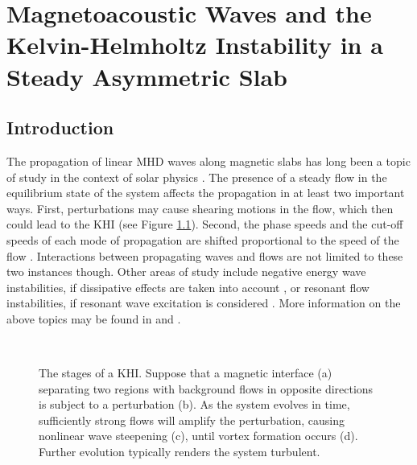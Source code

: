 \chapter{Magnetoacoustic Waves and the Kelvin-Helmholtz Instability in a Steady Asymmetric Slab}

\section{Introduction}

The propagation of linear MHD waves along magnetic slabs has long been a topic of study in the context of solar physics \citep[see, for example,][]{Roberts1981b}.
The presence of a steady flow in the equilibrium state of the system affects the propagation in at least two important ways.
First, perturbations may cause shearing motions in the flow, which then could lead to the KHI (see Figure \ref{KHI}).
Second, the phase speeds and the cut-off speeds of each mode of propagation are shifted proportional to the speed of the flow \citep[see, for example,][]{Nakariakov1995}.
Interactions between propagating waves and flows are not limited to these two instances though.
Other areas of study include negative energy wave instabilities, if dissipative effects are taken into account \citep{Cairns1979, Joarder1997}, or resonant flow instabilities, if resonant wave excitation is considered \citep[see][]{Tirry1998, Taroyan2002}. More information on the above topics may be found in \cite{Taroyan2011} and \cite{Ryutova2015}.

\begin{figure}[t]
\vspace{-5pt}
\centering
{}
\hspace{3pt}
\\[-7pt]
\hspace{3pt}
\caption{The stages of a KHI. Suppose that a magnetic interface (a) separating two regions with background flows in opposite directions is subject to a perturbation (b). As the system evolves in time, sufficiently strong flows will amplify the perturbation, causing nonlinear wave steepening (c), until vortex formation occurs (d). Further evolution typically renders the system turbulent.}
\label{KHI}
\end{figure}

